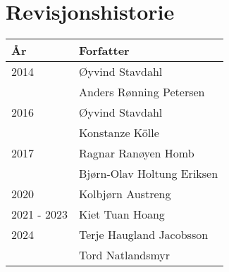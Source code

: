 \section*{Revisjonshistorie}
\begin{center}
 \begin{tabular}{|p{2.5cm} p{5.5cm}|} 
 \hline
 År & Forfatter \\ [0.5ex] 
 \hline\hline
 2014 & Øyvind Stavdahl\\
  & Anders Rønning Petersen\\
 \hline
 2016 & Øyvind Stavdahl\\
      & Konstanze Kölle\\
 \hline
 2017 & Ragnar Ranøyen Homb\\
      & Bjørn-Olav Holtung Eriksen\\
 \hline
 2020 & Kolbjørn Austreng  \\ 
 \hline
 2021 - 2023 & Kiet Tuan Hoang \\
 \hline
 2024 & Terje Haugland Jacobsson \\
      & Tord Natlandsmyr        \\
 \hline
\end{tabular}
\end{center}